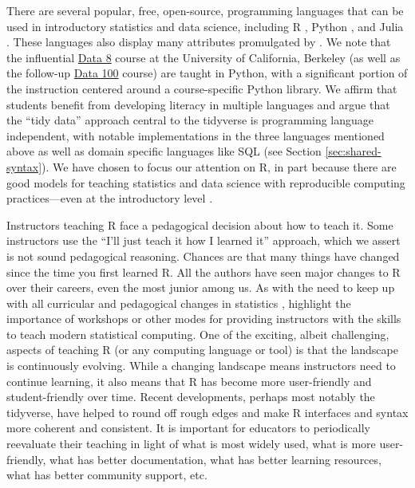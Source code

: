 \documentclass[12pt]{article}
\begin{document}
There are several popular, free, open-source, programming languages that
can be used in introductory statistics and data science, including R
\citep{Rlang}, Python \citep{CS-R9526}, and Julia
\citep{mcnicholas2019data}. These languages also display many attributes
promulgated by \citet{mcna_2019}. We note that the influential
\href{http://data8.org/}{Data 8} course at the University of California,
Berkeley (as well as the follow-up \href{https://ds100.org/sp21/}{Data
100} course) are taught in Python, with a significant portion of the
instruction centered around a course-specific Python library. We affirm
that students benefit from developing literacy in multiple languages and
argue that the ``tidy data'' \citep{wickham2014tidy} approach central to
the tidyverse is programming language independent, with notable
implementations in the three languages mentioned above as well as domain
specific languages like SQL (see Section \ref{sec:shared-syntax}). We
have chosen to focus our attention on R, in part because there are good
models for teaching statistics and data science with reproducible
computing practices---even at the introductory level
\citep{baumer2014, beckman2021implementing}.

Instructors teaching R face a pedagogical decision about how to teach
it. Some instructors use the ``I'll just teach it how I learned it''
approach, which we assert is not sound pedagogical reasoning. Chances
are that many things have changed since the time you first learned R.
All the authors have seen major changes to R over their careers, even
the most junior among us. As with the need to keep up with all
curricular and pedagogical changes in statistics \citep{zieffler2008},
\citet{nolan_templelang_2010} highlight the importance of workshops or
other modes for providing instructors with the skills to teach modern
statistical computing. One of the exciting, albeit challenging, aspects
of teaching R (or any computing language or tool) is that the landscape
is continuously evolving. While a changing landscape means instructors
need to continue learning, it also means that R has become more
user-friendly and student-friendly over time. Recent developments,
perhaps most notably the tidyverse, have helped to round off rough edges
and make R interfaces and syntax more coherent and consistent. It is
important for educators to periodically reevaluate their teaching in
light of what is most widely used, what is more user-friendly, what has
better documentation, what has better learning resources, what has
better community support, etc.
\end{document}
